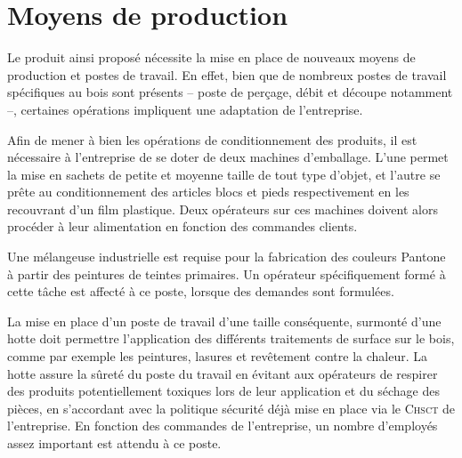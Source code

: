 \section{Moyens de production}

Le produit ainsi proposé nécessite la mise en place de nouveaux
moyens de production et postes de travail. En effet, bien que de nombreux
postes de travail spécifiques au bois sont présents -- poste de perçage,
débit et découpe notamment --, certaines opérations impliquent une adaptation
de l'entreprise.

Afin de mener à bien les opérations de conditionnement des produits,
il est nécessaire à l'entreprise de se doter de deux machines d'emballage.
L'une permet la mise en sachets de petite et moyenne taille de tout type
d'objet, et l'autre se prête au conditionnement des articles blocs et pieds
respectivement en les recouvrant d'un film plastique.
Deux opérateurs sur ces machines doivent alors procéder à leur alimentation
en fonction des commandes clients.

Une mélangeuse industrielle est requise pour la fabrication des couleurs
Pantone\textregistered{} à partir des peintures de teintes primaires.
Un opérateur spécifiquement formé à cette tâche est affecté à ce poste,
lorsque des demandes sont formulées.

La mise en place d'un poste de travail d'une taille conséquente, surmonté
d'une hotte doit permettre l'application des différents traitements de
surface sur le bois, comme par exemple les peintures, lasures et revêtement
contre la chaleur. La hotte assure la sûreté du poste du travail en évitant
aux opérateurs de respirer des produits potentiellement toxiques lors de
leur application et du séchage des pièces, en s'accordant avec la politique
sécurité déjà mise en place via le \textsc{Chsct} de l'entreprise.
En fonction des commandes de l'entreprise, un nombre d'employés assez
important est attendu à ce poste.
